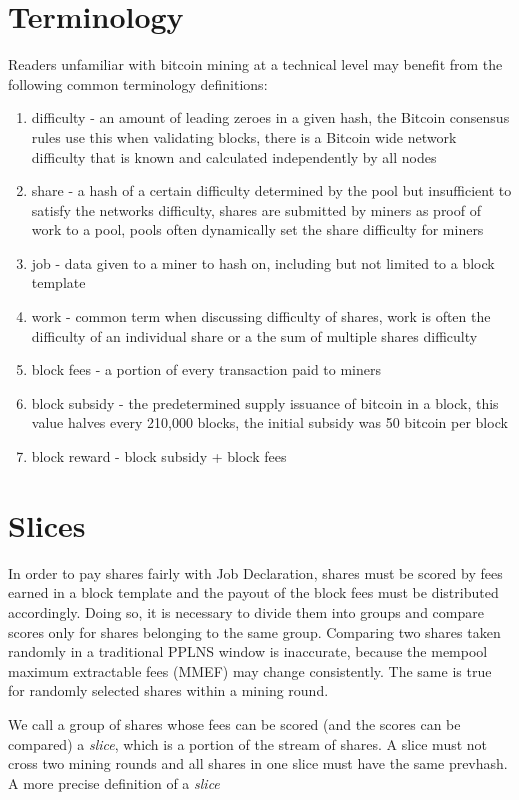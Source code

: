 \documentclass[11pt]{article}
\begin{document}
\section{Terminology}

Readers unfamiliar with bitcoin mining at a technical level may benefit from the following common terminology definitions:

\begin{enumerate}
	\item difficulty - an amount of leading zeroes in a given hash, the Bitcoin consensus rules use this when validating blocks, there is a Bitcoin wide network difficulty that is known and calculated independently by all nodes
	\item share - a hash of a certain difficulty determined by the pool but insufficient to satisfy the networks difficulty, shares are submitted by miners as proof of work to a pool, pools often dynamically set the share difficulty for miners
	\item job - data given to a miner to hash on, including but not limited to a block template
	\item work - common term when discussing difficulty of shares, work is often the difficulty of an individual share or a the sum of multiple shares difficulty
	\item block fees - a portion of every transaction paid to miners
	\item block subsidy - the predetermined supply issuance of bitcoin in a block, this value halves every 210,000 blocks, the initial subsidy was 50 bitcoin per block
	\item block reward - block subsidy + block fees
\end{enumerate}

\section{Slices}
In order to pay shares fairly with Job Declaration, shares must be scored by fees earned in a block template and the payout of the block fees must be distributed accordingly. Doing so, it is necessary to divide them into groups and compare scores only for shares belonging to the same group. Comparing two shares taken randomly in a traditional PPLNS window is inaccurate, because the mempool maximum extractable fees (MMEF) may change consistently. The same is true for randomly selected shares within a mining round.

We call a group of shares whose fees can be scored (and the scores can be compared) a \emph{slice}, which is a portion of the stream of shares. A slice must not cross two mining rounds and all shares in one slice must have the same prevhash. A more precise definition of a \emph{slice}
\end{document}
